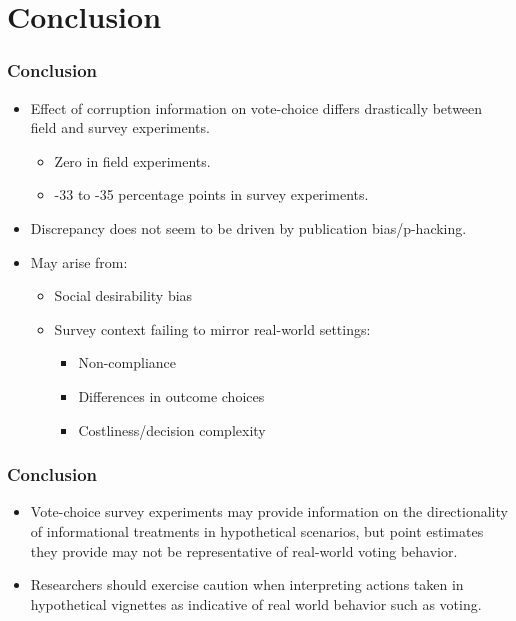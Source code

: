 \documentclass[usenames,dvipsnames]{beamer}
\begin{document}
\section{Conclusion}

\begin{frame}
\frametitle{Conclusion}
\begin{itemize}
\pause
\item Effect of corruption information on vote-choice \textcolor{Cerulean}{differs drastically} between field and survey experiments.
\begin{itemize}
\pause
\item \textcolor{Cerulean}{Zero} in field experiments.
\item \textcolor{Cerulean}{-33 to -35 percentage points} in survey experiments. 
\end{itemize}
\pause
\item Discrepancy does not seem to be driven by publication bias/p-hacking.
\pause
\item May arise from:
\begin{itemize} 
\pause
\item Social desirability bias
\pause
\item Survey context failing to mirror real-world settings:
\begin{itemize}
\item Non-compliance
\item Differences in outcome choices
\item Costliness/decision complexity
\end{itemize}
\end{itemize}
\end{itemize}
\end{frame}


\begin{frame}
\frametitle{Conclusion}
\begin{itemize}
\item Vote-choice \textcolor{Cerulean}{survey experiments} may provide information on the directionality of informational treatments in hypothetical scenarios, but point estimates they provide \textcolor{Cerulean}{may not be representative of real-world voting behavior}. 
\pause
\item Researchers should \textcolor{Cerulean}{exercise caution} when interpreting actions taken in hypothetical vignettes as indicative of real world behavior such as voting. 
\end{itemize}

\end{frame}
\end{document}
